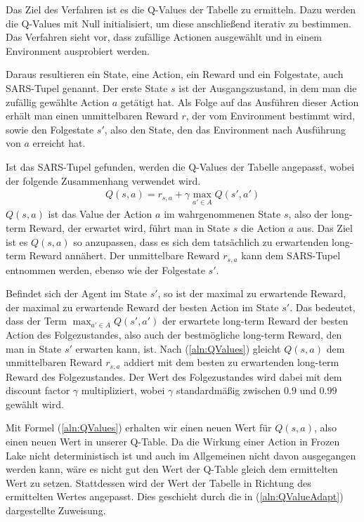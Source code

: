 \documentclass[11pt]{scrartcl}
\begin{document}
\noindent
Das Ziel des Verfahren ist es die Q-Values der Tabelle zu ermitteln. Dazu werden die
Q-Values mit Null initialisiert, um diese anschließend iterativ zu bestimmen. Das Verfahren 
sieht vor, dass zufällige Actionen ausgewählt und in einem Environment ausprobiert werden.

Daraus resultieren ein State, eine Action, ein Reward und ein Folgestate, auch SARS-Tupel
genannt. Der erste State $s$ ist der Ausgangszustand, in dem man die zufällig gewählte
Action $a$ getätigt hat. Als Folge auf das Ausführen dieser Action erhält man einen
unmittelbaren Reward $r$, der vom Environment bestimmt wird, sowie den Folgestate $s'$,
also den State, den das Environment nach Ausführung von $a$ erreicht hat.

Ist das SARS-Tupel gefunden, werden die Q-Values der Tabelle angepasst, wobei der folgende
Zusammenhang verwendet wird.
\begin{align}
Q(s, a) = r_{s,a} + \gamma \max_{a' \in A}Q(s', a')
\label{aln:QValues}
\end{align}
\noindent
$Q(s, a)$ ist das Value der Action $a$ im wahrgenommenen State $s$, also der long-term
Reward, der erwartet wird, führt man in State $s$ die Action $a$ aus. Das Ziel ist es
$Q(s, a)$ so anzupassen, dass es sich dem tatsächlich zu erwartenden long-term Reward
annähert. Der unmittelbare Reward $r_{s,a}$ kann dem SARS-Tupel entnommen werden, ebenso
wie der Folgestate $s'$.

Befindet sich der Agent im State $s'$, so ist der maximal zu erwartende Reward, der 
maximal zu erwartende Reward der besten Action im State $s'$. Das bedeutet, dass
der Term $\max_{a'\in A} Q(s', a')$ der erwartete long-term Reward der besten Action des
Folgezustandes, also auch der bestmögliche long-term Reward, den man in State $s'$
erwarten kann, ist. Nach (\ref{aln:QValues}) gleicht $Q(s, a)$ dem unmittelbaren Reward
$r_{s,a}$ addiert mit dem besten zu erwartenden long-term Reward des Folgezustandes. Der
Wert des Folgezustandes wird dabei mit dem discount factor $\gamma$ multipliziert, wobei 
$\gamma$ standardmäßig zwischen $0.9$ und $0.99$ gewählt wird.

Mit Formel (\ref{aln:QValues}) erhalten wir einen neuen Wert für $Q(s, a)$, also einen
neuen Wert in unserer Q-Table. Da die Wirkung einer Action in Frozen Lake nicht
deterministisch ist und auch im Allgemeinen nicht davon ausgegangen werden kann, wäre es
nicht gut den Wert der Q-Table gleich dem ermittelten Wert zu setzen. Stattdessen wird der
Wert der Tabelle in Richtung des ermittelten Wertes angepasst. Dies geschieht durch die in
(\ref{aln:QValueAdapt}) dargestellte Zuweisung.
\end{document}
